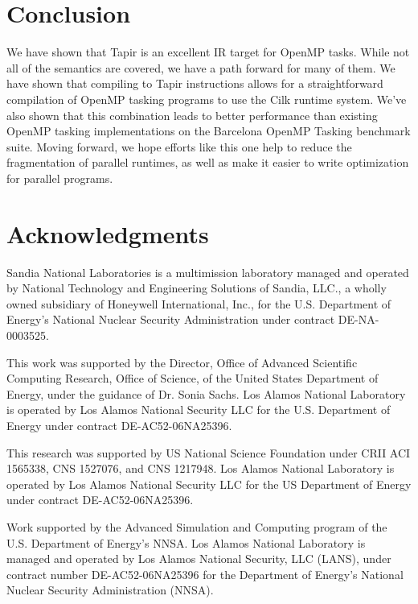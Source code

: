 \documentclass[sigconf]{acmart}
\begin{document}
\section{Conclusion} \label{Sec:Conclusion}
We have shown that Tapir is an excellent IR target for OpenMP tasks. While not
all of the semantics are covered, we have a path forward for many of them. We have
shown that compiling to Tapir instructions allows for a straightforward compilation of 
OpenMP tasking programs to use the Cilk runtime system. We've also shown that this
combination leads to better performance than existing OpenMP tasking implementations
on the Barcelona OpenMP Tasking benchmark suite. Moving forward, we hope efforts like
this one help to reduce the fragmentation of parallel runtimes, as well as make
it easier to write optimization for parallel programs. 

\section*{Acknowledgments}
Sandia National Laboratories is a multimission laboratory managed and operated 
by National Technology and Engineering Solutions of Sandia, LLC., a wholly 
owned subsidiary of Honeywell International, Inc., for the U.S. Department of 
Energy's National Nuclear Security Administration under contract DE-NA-0003525.


This work was supported by the Director, Office of Advanced Scientific
Computing Research, Office of Science, of the United States Department
of Energy, under the guidance of Dr. Sonia Sachs. Los Alamos National
Laboratory is operated by Los Alamos National Security LLC for the U.S.
Department of Energy under contract DE-AC52-06NA25396.

This research was supported by US National Science Foundation under CRII
ACI 1565338, CNS 1527076, and CNS 1217948. Los Alamos National
Laboratory is operated by Los Alamos National Security LLC for the US
Department of Energy under contract DE-AC52-06NA25396.

Work supported by the Advanced Simulation and Computing program of the
U.S. Department of Energy's NNSA\@.  Los Alamos National Laboratory is
managed and operated by Los Alamos National Security, LLC (LANS), under
contract number DE-AC52-06NA25396 for the Department of Energy's
National Nuclear Security Administration (NNSA).



\end{document}
